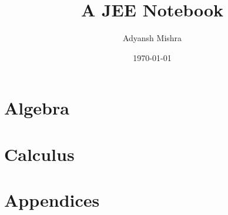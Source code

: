 \documentclass[twoside, a4paper, 10pt, bibliography=totoc, index=totoc, listof=totoc]{scrbook}
\begin{document}
    \author{Adyansh Mishra}
    \date{\today}
    \title{A JEE Notebook}
    \fncytitle

    \tableofcontents
     
    \frontmatter
    
    
    \mainmatter
    
    \part{Algebra}
    
    


    \part{Calculus}
    

    \part{Appendices}
    \restoregeometry

    \appendix
    

    \backmatter
    \printindex
\end{document}
